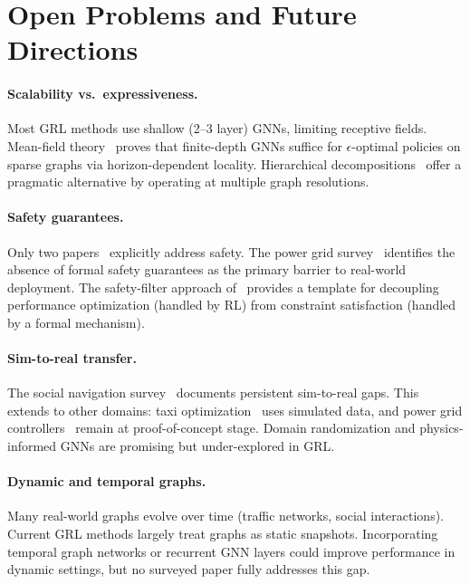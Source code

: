 \documentclass{article}
\begin{document}
\section{Open Problems and Future Directions}
\label{sec:challenges}

\paragraph{Scalability vs.\ expressiveness.}
Most GRL methods use shallow (2--3 layer) GNNs, limiting receptive fields. Mean-field theory~\cite{mfc2026} proves that finite-depth GNNs suffice for $\epsilon$-optimal policies on sparse graphs via horizon-dependent locality. Hierarchical decompositions~\cite{qjl2026} offer a pragmatic alternative by operating at multiple graph resolutions.

\paragraph{Safety guarantees.}
Only two papers~\cite{safenav2025, qjl2026} explicitly address safety. The power grid survey~\cite{powergrid2025} identifies the absence of formal safety guarantees as the primary barrier to real-world deployment. The safety-filter approach of~\cite{safenav2025} provides a template for decoupling performance optimization (handled by RL) from constraint satisfaction (handled by a formal mechanism).

\paragraph{Sim-to-real transfer.}
The social navigation survey~\cite{socialnav2025} documents persistent sim-to-real gaps. This extends to other domains: taxi optimization~\cite{taxi2026} uses simulated data, and power grid controllers~\cite{powergrid2025} remain at proof-of-concept stage. Domain randomization and physics-informed GNNs are promising but under-explored in GRL.

\paragraph{Dynamic and temporal graphs.}
Many real-world graphs evolve over time (traffic networks, social interactions). Current GRL methods largely treat graphs as static snapshots. Incorporating temporal graph networks or recurrent GNN layers could improve performance in dynamic settings, but no surveyed paper fully addresses this gap.
\end{document}
